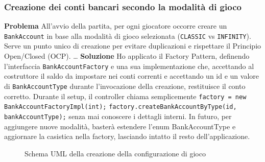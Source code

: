 \subsubsection{Creazione dei conti bancari secondo la modalità di gioco}
\textbf{Problema}\newline
All'avvio della partita, per ogni giocatore occorre creare un \texttt{BankAccount} in base alla modalità di gioco selezionata (\texttt{CLASSIC} vs \texttt{INFINITY}).\newline
Serve un punto unico di creazione per evitare duplicazioni e rispettare il Principio Open/Closed (OCP).
\dots\newline
\textbf{Soluzione}\newline
Ho applicato il Factory Pattern, definendo l'interfaccia \texttt{BankAccountFactory} e una sua implementazione che, accettando al costruttore il saldo da impostare nei conti correnti 
e accettando un id e un valore di \texttt{BankAccountType} durante l'invocazione della creazione, restituisce il conto corretto.\newline
Durante il setup, il controller chiama semplicemente\newline
	\texttt{factory = new BankAccountFactoryImpl(int);}\newline
	\texttt{factory.createBankAccountByType(id, bankAccountType);}\newline
senza mai conoscere i dettagli interni.\newline
In futuro, per aggiungere nuove modalità, basterà estendere l'enum BankAccountType e aggiornare la casistica nella factory, lasciando intatto il resto dell'applicazione.\newline
\newline
\begin{figure}[H]
    \centering
    \caption{Schema UML della creazione della configurazione di gioco}
	\label{img:BankAccountFactory}
\end{figure}